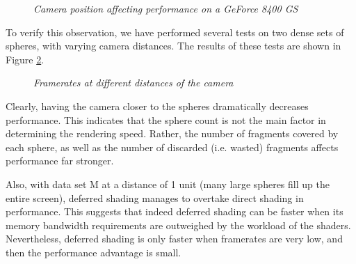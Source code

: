 \begin{figure}[!ht]
\caption{\em Camera position affecting performance on a GeForce 8400 GS}
\label{f:camdist}
\end{figure}

To verify this observation, we have performed several tests on two dense sets of spheres, with varying camera distances.
The results of these tests are shown in Figure \ref{f:cam-dist}.

\begin{figure}[!ht]
\centering
{}
\caption{\em Framerates at different distances of the camera}
\label{f:cam-dist}
\end{figure}

Clearly, having the camera closer to the spheres dramatically decreases performance.
This indicates that the sphere count is not the main factor in determining the rendering speed.
Rather, the number of fragments covered by each sphere, as well as the number of discarded (i.e. wasted) fragments affects performance far stronger.

Also, with data set M at a distance of 1 unit (many large spheres fill up the entire screen), 
deferred shading manages to overtake direct shading in performance.
This suggests that indeed deferred shading can be faster when its memory bandwidth requirements are outweighed by the workload of the shaders.
Nevertheless, deferred shading is only faster when framerates are very low, and then the performance advantage is small.

